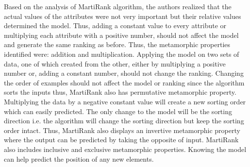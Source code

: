 Based on the analysis of MartiRank algorithm, the authors realized that the actual values of the attributes were not very important but their relative values determined the model. Thus, adding a constant value to every attribute or multiplying each attribute with a positive number, should not affect the model and generate the same ranking as before. Thus, the metamorphic properties identified were: addition and multiplication. Applying the model on two sets of data, one of which created from the other, either by multiplying a positive number or, adding a constant number, should not change the ranking. Changing the order of examples should not affect the model or ranking since the algorithm sorts the inputs thus, MartiRank also has permutative metamorphic property. Multiplying the data by a negative constant value will create a new sorting order which can easily predicted. The only change to the model will be the sorting direction i.e. the algorithm will change the sorting direction but keep the sorting order intact. Thus, MartiRank also displays an invertive metamorphic property where the output can be predicted by taking the opposite of input. MartiRank also includes inclusive and exclusive metamorphic properties. Knowing the model can help predict the position of any new elements.
